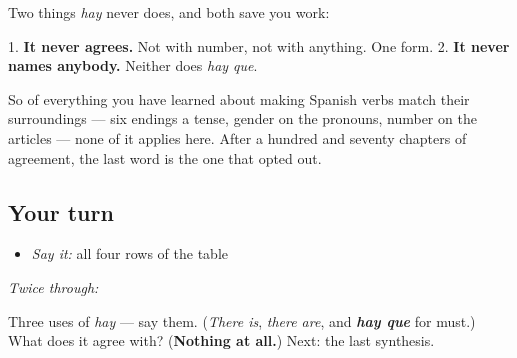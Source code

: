 \begin{grammarlens}[title={Grammar Lens: what it does not do}]
Two things \emph{hay} never does, and both save you work:

1. \textbf{It never agrees.} Not with number, not with anything. One form. 2. \textbf{It never names anybody.} Neither does \emph{hay que}.

So of everything you have learned about making Spanish verbs match their surroundings — six endings a tense, gender on the pronouns, number on the articles — none of it applies here. After a hundred and seventy chapters of agreement, the last word is the one that opted out.
\end{grammarlens}

\subsection*{Your turn}
\begin{itemize}
\raggedright
  \item \emph{Say it:} all four rows of the table
\end{itemize}

\emph{Twice through:}

\begin{tcolorbox}[breakable,colback=teal!4,colframe=teal!35!black,title={Before you move on}]
Three uses of \emph{hay} — say them. (\emph{There is}, \emph{there are}, and \emph{\textbf{hay que}} for must.) What does it agree with? (\textbf{Nothing at all.}) Next: the last synthesis.
\end{tcolorbox}
